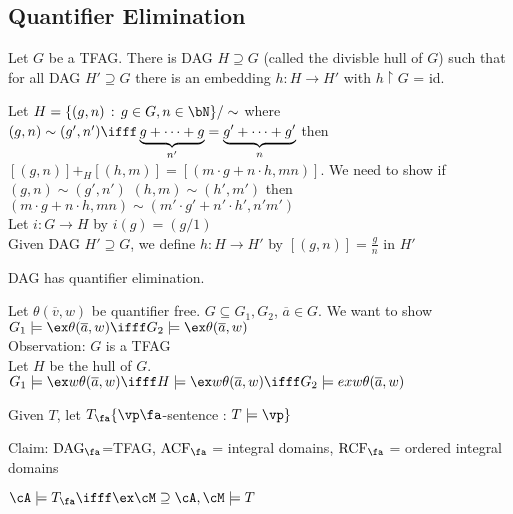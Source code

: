 
\subsection{Quantifier Elimination}

\begin{lemma}
    Let $G$ be a TFAG. There is DAG $H \supseteq G$ (called the divisble hull of $G$) such that for all DAG $H' \supseteq G$ there is an embedding $h: H \to H'$ with $h \upharpoonright G$ = id. 
\end{lemma}

\begin{pf}
    Let $H = \{(g,n) \, : \, g \in G, n \in \bN\}/\sim$ where $(g,n) \sim (g', n') \ifff \underbrace{g + \cdots + g}_{n'} = \underbrace{g' + \cdots + g'}_{n}$ then $[(g,n)]+_H [(h,m)] = [(m \cdot g + n \cdot h, mn)]$. We need to show if $(g,n) \sim (g',n')$ $(h,m) \sim (h', m')$ then $(m \cdot g + n \cdot h, mn) \sim (m' \cdot g' + n' \cdot h', n'm')$ \\
    Let $i: G \to H$ by $i(g)=(g/1)$ \\
    Given DAG $H' \supseteq G$, we define $h: H \to H'$ by $[(g, n)] = \frac{g}{n}$ in $H'$ 
\end{pf}

\begin{theorem}
    DAG has quantifier elimination. 
\end{theorem}

\begin{pf}
    Let $\theta(\overline{v},w)$ be quantifier free. $G \subseteq G_1, G_2$, $\overline{a} \in G$. We want to show $G_1 \models \ex \theta(\overline{a},w) \ifff G_2 \models \ex \theta(\overline{a}, w)$ \\
    Observation: $G$ is a TFAG \\
    Let $H$ be the hull of $G$. $G_1 \models \ex w \theta(\overline{a},w) \ifff H \models \ex w \theta(\overline{a},w) \ifff G_2 \models ex w \theta(\overline{a},w)$ 
\end{pf}

\begin{definition}
    Given $T$, let $T_{\fa} \{ \vp \fa$-sentence  : $T \models \vp\}$ 
\end{definition}

\noindent
Claim: $\text{DAG}_{\fa}$=TFAG, $\text{ACF}_{\fa}$ = integral domains, $\text{RCF}_{\fa}$ = ordered integral domains 

\begin{lemma}
    $\cA \models T_{\fa} \ifff \ex \cM \supseteq \cA, \cM \models T$ 
\end{lemma}

